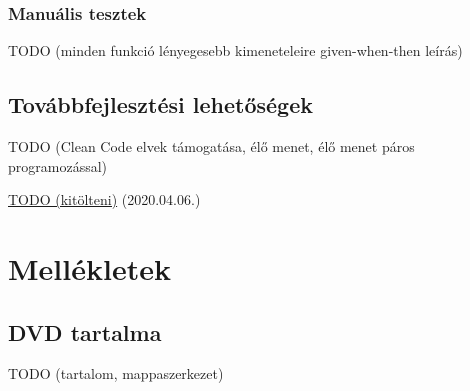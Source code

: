 \documentclass{elteikthesis}
\begin{document}
			\subsection{Manuális tesztek}
			TODO (minden funkció lényegesebb kimeneteleire given-when-then leírás)
		
		\section{Továbbfejlesztési lehetőségek}
		TODO (Clean Code elvek támogatása, élő menet, élő menet páros programozással)

	\begin{thebibliography}{99}


		\href{http://example.com}{TODO (kitölteni)} (2020.04.06.)

	\end{thebibliography}
	
	\chapter*{Mellékletek}


	\section*{DVD tartalma}
	TODO (tartalom, mappaszerkezet)
\end{document}
